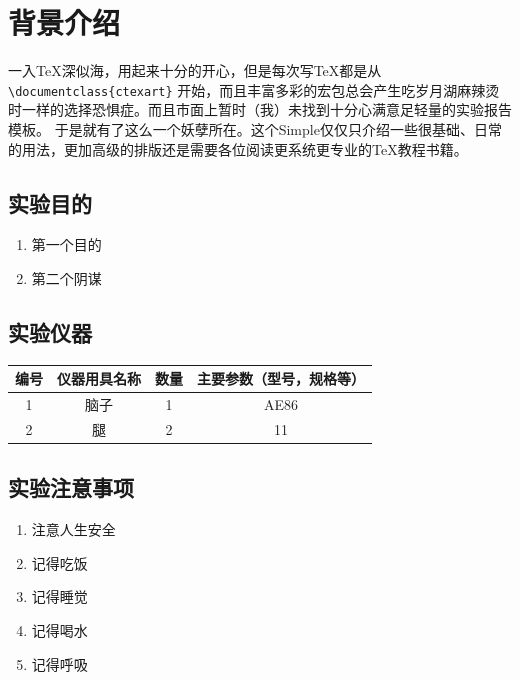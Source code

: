 \documentclass[no-math,zihao = -4]{ctexart} %
\begin{document}
\kaitou %

\section{背景介绍}
    一入\TeX 深似海，用起来十分的开心，但是每次写\TeX 都是从
    \verb|\documentclass{ctexart}|
    开始，而且丰富多彩的宏包总会产生吃岁月湖麻辣烫时一样的选择恐惧症。而且市面上暂时（我）未找到十分心满意足轻量的实验报告模板。
    于是就有了这么一个妖孽所在。这个Simple仅仅只介绍一些很基础、日常的用法，更加高级的排版还是需要各位阅读更系统更专业的\TeX 教程书籍。

    \subsection{实验目的}
        \begin{enumerate}
            \item 第一个目的
            \item 第二个阴谋
        \end{enumerate}

    \subsection{实验仪器}
        \begin{center}
            \begin{tabular}[c]{cccc}
                \toprule
                    编号   &仪器用具名称 &  数量   &主要参数（型号，规格等）\\ 
                \midrule
                    1    & 脑子   & 1 & AE86  \\ 
                    2    & 腿  & 2 & 11 \\ 
                \bottomrule
            \end{tabular}
            \label{tab:实验用具}
        \end{center}

    \subsection{实验注意事项}
        \begin{enumerate}
            \item 注意人生安全
            \item 记得吃饭
            \item 记得睡觉
            \item 记得喝水
            \item 记得呼吸
        \end{enumerate}
\end{document}
